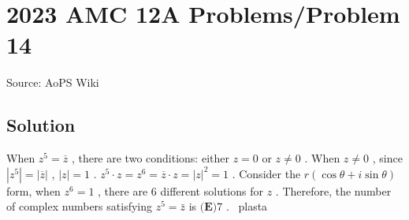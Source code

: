 \documentclass[12pt]{article}
\begin{document}
\section*{{2023 AMC 12A Problems/Problem 14}}
Source: AoPS Wiki

\subsection*{Solution}
When $z^5=\overline{z}$ , there are two conditions: either $z=0$ or $z\neq 0$ . When $z\neq 0$ , since $|z^5|=|\overline{z}|$ , $|z|=1$ . $z^5\cdot z=z^6=\overline{z}\cdot z=|z|^2=1$ . Consider the $r(\cos \theta +i\sin \theta)$ form, when $z^6=1$ , there are 6 different solutions for $z$ . Therefore, the number of complex numbers satisfying $z^5=\bar{z}$ is $\boxed{\textbf{(E)} 7}$ . ~plasta
\end{document}
